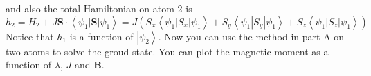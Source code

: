 \documentclass[letter]{article}
\begin{document}
and also the total Hamiltonian on atom 2 is
$$h_2=H_2+J\bm{S}\cdot\left<\psi_1|\bm{S}|\psi_1\right>=J(S_x\left<\psi_1|S_x|\psi_1\right>+S_y\left<\psi_1|S_y|\psi_1\right>+S_z\left<\psi_1|S_z|\psi_1\right>)
$$
Notice that $h_1$ is a function of $\left|\psi_2\right>$. Now you can use the method in part A on two atoms to solve the groud state. You can plot the magnetic moment as a function of $\lambda$, $J$ and $\bm{B}$.\\
\end{document}
